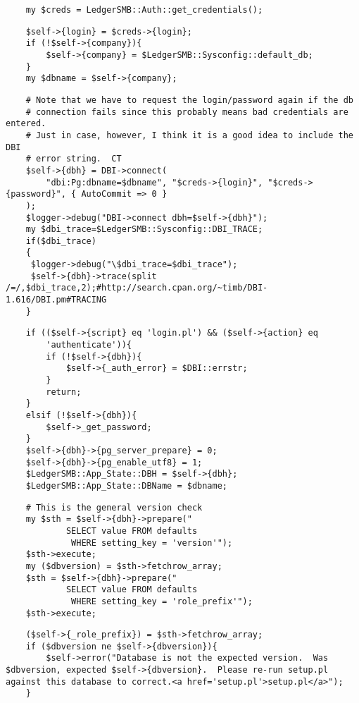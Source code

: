 \begin{verbatim}
    my $creds = LedgerSMB::Auth::get_credentials();
\end{verbatim}
\begin{verbatim}
    $self->{login} = $creds->{login};
    if (!$self->{company}){ 
        $self->{company} = $LedgerSMB::Sysconfig::default_db;
    }
    my $dbname = $self->{company};
\end{verbatim}
\begin{verbatim}
    # Note that we have to request the login/password again if the db
    # connection fails since this probably means bad credentials are entered.
    # Just in case, however, I think it is a good idea to include the DBI
    # error string.  CT
    $self->{dbh} = DBI->connect(
        "dbi:Pg:dbname=$dbname", "$creds->{login}", "$creds->{password}", { AutoCommit => 0 }
    ); 
    $logger->debug("DBI->connect dbh=$self->{dbh}");
    my $dbi_trace=$LedgerSMB::Sysconfig::DBI_TRACE;
    if($dbi_trace)
    {
     $logger->debug("\$dbi_trace=$dbi_trace");
     $self->{dbh}->trace(split /=/,$dbi_trace,2);#http://search.cpan.org/~timb/DBI-1.616/DBI.pm#TRACING
    }
\end{verbatim}
\begin{verbatim}
    if (($self->{script} eq 'login.pl') && ($self->{action} eq 
        'authenticate')){
        if (!$self->{dbh}){
            $self->{_auth_error} = $DBI::errstr;
        }
        return;
    }
    elsif (!$self->{dbh}){
        $self->_get_password;
    }
    $self->{dbh}->{pg_server_prepare} = 0;
    $self->{dbh}->{pg_enable_utf8} = 1;
    $LedgerSMB::App_State::DBH = $self->{dbh};
    $LedgerSMB::App_State::DBName = $dbname;
\end{verbatim}
\begin{verbatim}
    # This is the general version check
    my $sth = $self->{dbh}->prepare("
            SELECT value FROM defaults 
             WHERE setting_key = 'version'");
    $sth->execute;
    my ($dbversion) = $sth->fetchrow_array;
    $sth = $self->{dbh}->prepare("
            SELECT value FROM defaults 
             WHERE setting_key = 'role_prefix'");
    $sth->execute;
\end{verbatim}
\begin{verbatim}
    ($self->{_role_prefix}) = $sth->fetchrow_array;
    if ($dbversion ne $self->{dbversion}){
        $self->error("Database is not the expected version.  Was $dbversion, expected $self->{dbversion}.  Please re-run setup.pl against this database to correct.<a href='setup.pl'>setup.pl</a>");
    }
\end{verbatim}
